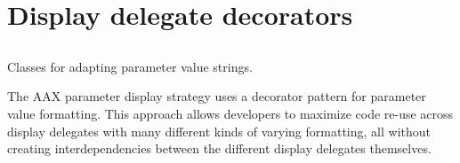 \hypertarget{a00347}{}\section{Display delegate decorators}
\label{a00347}


\subsection{ }
Classes for adapting parameter value strings. 

The A\+A\+X parameter display strategy uses a decorator pattern for parameter value formatting. This approach allows developers to maximize code re-\/use across display delegates with many different kinds of varying formatting, all without creating interdependencies between the different display delegates themselves.

